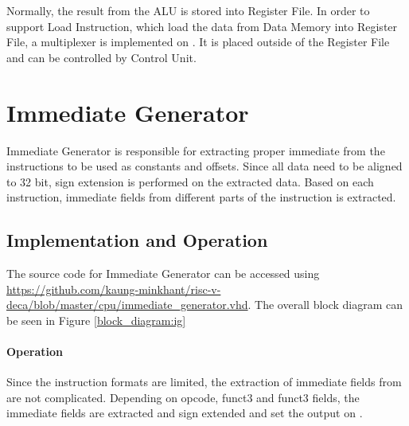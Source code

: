 Normally, the result from the ALU is stored into Register File.
In order to support Load Instruction, which load the data from Data Memory into Register File, a multiplexer is implemented on .
It is placed outside of the Register File and can be controlled by Control Unit.

\section{Immediate Generator}
Immediate Generator is responsible for extracting proper immediate from the instructions to be used as constants and offsets.
Since all data need to be aligned to 32 bit, sign extension is performed on the extracted data.
Based on each instruction, immediate fields from different parts of the instruction is extracted.

\subsection{Implementation and Operation}
The source code for Immediate Generator
can be accessed using \url{https://github.com/kaung-minkhant/risc-v-deca/blob/master/cpu/immediate_generator.vhd}.
The overall block diagram can be seen in Figure \ref{block_diagram:ig}

\begin{table}[!h]
    \centering
    \caption{Input/Output of Immediate Generator}
    \label{table:io_ig}
\end{table}

\paragraph*{Operation}
Since the instruction formats are limited, the extraction of immediate fields from  are not complicated.
Depending on opcode, funct3 and funct3 fields, the immediate fields are extracted and sign extended and set the output on .

